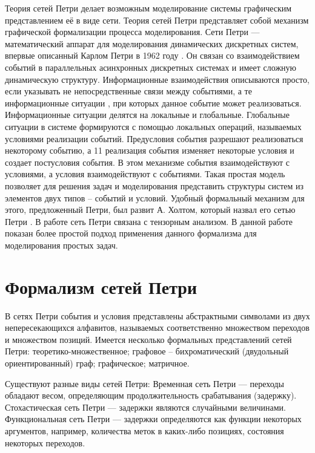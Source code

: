 Теория сетей Петри делает возможным моделирование системы графическим представлением её в виде сети. Теория сетей Петри представляет собой механизм графической формализации процесса моделирования. Сети Петри — математический аппарат для моделирования динамических дискретных систем, впервые описанный Карлом Петри в 1962 году \cite{Petri}. Он связан со взаимодействием событий в параллельных асинхронных дискретных системах и имеет сложную динамическую структуру. Информационные взаимодействия \cite{Tsvetkov1} описываются просто, если указывать не непосредственные связи между событиями, а те информационные ситуации \cite{Tsvetkov2}, при которых данное событие может реализоваться. Информационные ситуации делятся на локальные и глобальные. Глобальные ситуации в системе формируются с помощью локальных операций, называемых условиями реализации событий. Предусловия события разрешают реализоваться некоторому событию, а 11 реализация события изменяет некоторые условия и создает постусловия события. В этом механизме события взаимодействуют с условиями, а условия взаимодействуют с событиями. Такая простая модель позволяет для решения задач и моделирования представить структуры систем из элементов двух типов – событий и условий. Удобный формальный механизм для этого, предложенный Петри, был развит А. Холтом, который назвал его сетью Петри \cite{Meldman}. В работе \cite{Kulagin} сеть Петри связана с тензорным анализом. В данной работе показан более простой подход применения данного формализма для моделирования простых задач.

\section{Формализм сетей Петри}

В сетях Петри события и условия представлены абстрактными символами из двух непересекающихся алфавитов, называемых соответственно множеством переходов и множеством позиций. Имеется несколько формальных представлений сетей Петри: теоретико-множественное; графовое – бихроматический (двудольный ориентированный) граф; графическое; матричное.

Существуют разные виды сетей Петри: Временная сеть Петри — переходы обладают весом, определяющим продолжительность срабатывания (задержку). Стохастическая сеть Петри — задержки являются случайными величинами. Функциональная сеть Петри — задержки определяются как функции некоторых аргументов, например, количества меток в каких-либо позициях, состояния некоторых переходов.

